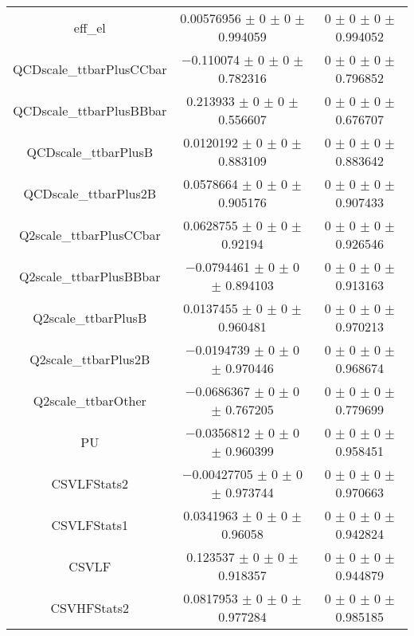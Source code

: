 \begin{table}
\begin{tabular}{ccc}
eff\_el & \num{0.00576956} $\pm$ \num{0} $\pm$ \num{0} $\pm$ \num{0.994059} & \num{0} $\pm$ \num{0} $\pm$ \num{0} $\pm$ \num{0.994052}\\
QCDscale\_ttbarPlusCCbar & \num{-0.110074} $\pm$ \num{0} $\pm$ \num{0} $\pm$ \num{0.782316} & \num{0} $\pm$ \num{0} $\pm$ \num{0} $\pm$ \num{0.796852}\\
QCDscale\_ttbarPlusBBbar & \num{0.213933} $\pm$ \num{0} $\pm$ \num{0} $\pm$ \num{0.556607} & \num{0} $\pm$ \num{0} $\pm$ \num{0} $\pm$ \num{0.676707}\\
QCDscale\_ttbarPlusB & \num{0.0120192} $\pm$ \num{0} $\pm$ \num{0} $\pm$ \num{0.883109} & \num{0} $\pm$ \num{0} $\pm$ \num{0} $\pm$ \num{0.883642}\\
QCDscale\_ttbarPlus2B & \num{0.0578664} $\pm$ \num{0} $\pm$ \num{0} $\pm$ \num{0.905176} & \num{0} $\pm$ \num{0} $\pm$ \num{0} $\pm$ \num{0.907433}\\
Q2scale\_ttbarPlusCCbar & \num{0.0628755} $\pm$ \num{0} $\pm$ \num{0} $\pm$ \num{0.92194} & \num{0} $\pm$ \num{0} $\pm$ \num{0} $\pm$ \num{0.926546}\\
Q2scale\_ttbarPlusBBbar & \num{-0.0794461} $\pm$ \num{0} $\pm$ \num{0} $\pm$ \num{0.894103} & \num{0} $\pm$ \num{0} $\pm$ \num{0} $\pm$ \num{0.913163}\\
Q2scale\_ttbarPlusB & \num{0.0137455} $\pm$ \num{0} $\pm$ \num{0} $\pm$ \num{0.960481} & \num{0} $\pm$ \num{0} $\pm$ \num{0} $\pm$ \num{0.970213}\\
Q2scale\_ttbarPlus2B & \num{-0.0194739} $\pm$ \num{0} $\pm$ \num{0} $\pm$ \num{0.970446} & \num{0} $\pm$ \num{0} $\pm$ \num{0} $\pm$ \num{0.968674}\\
Q2scale\_ttbarOther & \num{-0.0686367} $\pm$ \num{0} $\pm$ \num{0} $\pm$ \num{0.767205} & \num{0} $\pm$ \num{0} $\pm$ \num{0} $\pm$ \num{0.779699}\\
PU & \num{-0.0356812} $\pm$ \num{0} $\pm$ \num{0} $\pm$ \num{0.960399} & \num{0} $\pm$ \num{0} $\pm$ \num{0} $\pm$ \num{0.958451}\\
CSVLFStats2 & \num{-0.00427705} $\pm$ \num{0} $\pm$ \num{0} $\pm$ \num{0.973744} & \num{0} $\pm$ \num{0} $\pm$ \num{0} $\pm$ \num{0.970663}\\
CSVLFStats1 & \num{0.0341963} $\pm$ \num{0} $\pm$ \num{0} $\pm$ \num{0.96058} & \num{0} $\pm$ \num{0} $\pm$ \num{0} $\pm$ \num{0.942824}\\
CSVLF & \num{0.123537} $\pm$ \num{0} $\pm$ \num{0} $\pm$ \num{0.918357} & \num{0} $\pm$ \num{0} $\pm$ \num{0} $\pm$ \num{0.944879}\\
CSVHFStats2 & \num{0.0817953} $\pm$ \num{0} $\pm$ \num{0} $\pm$ \num{0.977284} & \num{0} $\pm$ \num{0} $\pm$ \num{0} $\pm$ \num{0.985185}\\

\end{tabular}
\end{table}
